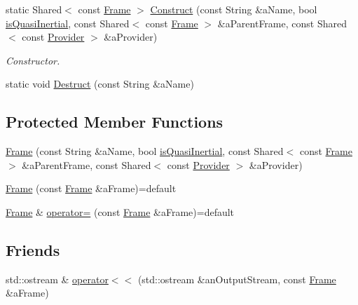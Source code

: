 \begin{DoxyCompactItemize}
\item 
static Shared$<$ const \hyperlink{classlibrary_1_1physics_1_1coord_1_1_frame}{Frame} $>$ \hyperlink{classlibrary_1_1physics_1_1coord_1_1_frame_acdadad4d650b63c1d4ad05d5268e0b79}{Construct} (const String \&a\+Name, bool \hyperlink{classlibrary_1_1physics_1_1coord_1_1_frame_a894d1ac6152e28dbb749058ca6ffd663}{is\+Quasi\+Inertial}, const Shared$<$ const \hyperlink{classlibrary_1_1physics_1_1coord_1_1_frame}{Frame} $>$ \&a\+Parent\+Frame, const Shared$<$ const \hyperlink{classlibrary_1_1physics_1_1coord_1_1frame_1_1_provider}{Provider} $>$ \&a\+Provider)
\begin{DoxyCompactList}\small\item\em Constructor. \end{DoxyCompactList}\item 
static void \hyperlink{classlibrary_1_1physics_1_1coord_1_1_frame_a2d4229290a0332c70240ebc8b02bd132}{Destruct} (const String \&a\+Name)
\end{DoxyCompactItemize}
\subsection*{Protected Member Functions}
\begin{DoxyCompactItemize}
\item 
\hyperlink{classlibrary_1_1physics_1_1coord_1_1_frame_a6a8410c8b29584fe2c2c78370c72f695}{Frame} (const String \&a\+Name, bool \hyperlink{classlibrary_1_1physics_1_1coord_1_1_frame_a894d1ac6152e28dbb749058ca6ffd663}{is\+Quasi\+Inertial}, const Shared$<$ const \hyperlink{classlibrary_1_1physics_1_1coord_1_1_frame}{Frame} $>$ \&a\+Parent\+Frame, const Shared$<$ const \hyperlink{classlibrary_1_1physics_1_1coord_1_1frame_1_1_provider}{Provider} $>$ \&a\+Provider)
\item 
\hyperlink{classlibrary_1_1physics_1_1coord_1_1_frame_abacc320c21194a591bf76612d91bafb9}{Frame} (const \hyperlink{classlibrary_1_1physics_1_1coord_1_1_frame}{Frame} \&a\+Frame)=default
\item 
\hyperlink{classlibrary_1_1physics_1_1coord_1_1_frame}{Frame} \& \hyperlink{classlibrary_1_1physics_1_1coord_1_1_frame_a31c2c947b4b27a9873d4eda7816e8247}{operator=} (const \hyperlink{classlibrary_1_1physics_1_1coord_1_1_frame}{Frame} \&a\+Frame)=default
\end{DoxyCompactItemize}
\subsection*{Friends}
\begin{DoxyCompactItemize}
\item 
std\+::ostream \& \hyperlink{classlibrary_1_1physics_1_1coord_1_1_frame_a509ac1926cfc3553748bace204e2b1cc}{operator$<$$<$} (std\+::ostream \&an\+Output\+Stream, const \hyperlink{classlibrary_1_1physics_1_1coord_1_1_frame}{Frame} \&a\+Frame)
\end{DoxyCompactItemize}


